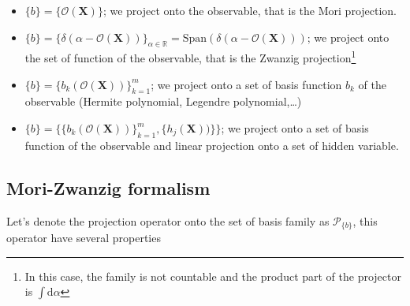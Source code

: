 \documentclass{article}
\numberwithin{equation}{section} %
\newcommand{\vect}[1]{\bm{#1}}
\newcommand{\R}{\mathbb{R}} %
\newcommand{\1}{\mathds{1}} %
\newcommand{\dd}{\mathrm{d}} %
\begin{document}
\begin{itemize}
    \item $\{b\} = \{\mathcal{O}(\vect{X})\}$; we project onto the observable, that is the Mori projection.
    \item $\{b\} = \{\delta(\alpha - \mathcal{O}(\vect{X}))\}_{\alpha \in \R} = \text{Span}(\delta(\alpha - \mathcal{O}(\vect{X})))$; we project onto the set of function of the observable, that is the Zwanzig projection\footnote{In this case, the family is not countable and the product part of the projector is $\int \dd \alpha $}
    \item $\{b\} = \{b_k(\mathcal{O}(\vect{X}))\}_{k=1}^{m}$; we project onto a set of basis function $b_k$ of the observable (Hermite polynomial, Legendre polynomial,\ldots)
    \item $\{b\} = \{\{b_k(\mathcal{O}(\vect{X}))\}_{k=1}^{m}, \{h_j(\vect{X}))\}\}$; we project onto a set of basis function of the observable and linear projection onto a set of hidden variable.
\end{itemize}


\subsection{Mori-Zwanzig formalism}
Let's denote the projection operator onto the set of basis family as $\mathcal{P}_{\{b\}}$, this operator have several properties
\end{document}
